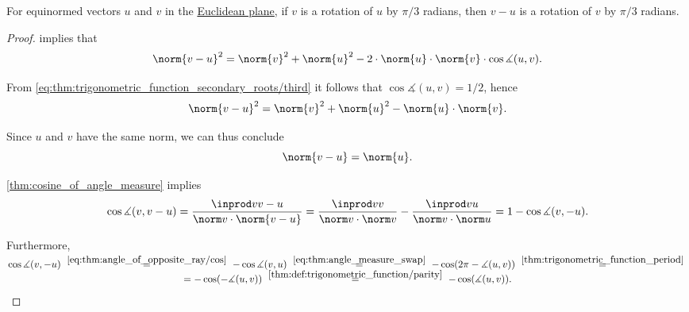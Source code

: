 \begin{lemma}\label{thm:v_minus_u_as_rotation}
  For equinormed vectors \( u \) and \( v \) in the \hyperref[def:euclidean_plane]{Euclidean plane}, if \( v \) is a rotation of \( u \) by \( \pi / 3 \) radians, then \( v - u \) is a rotation of \( v \) by \( \pi / 3 \) radians.
\end{lemma}
\begin{proof}
    implies that
  \begin{equation*}
    \norm{v - u}^2 = \norm{v}^2 + \norm{u}^2 - 2 \cdot \norm{u} \cdot \norm{v} \cdot \cos\measuredangle(u, v).
  \end{equation*}

  From \eqref{eq:thm:trigonometric_function_secondary_roots/third} it follows that \( \cos\measuredangle(u, v) = 1 / 2 \), hence
  \begin{equation*}
    \norm{v - u}^2 = \norm{v}^2 + \norm{u}^2 - \norm{u} \cdot \norm{v}.
  \end{equation*}

  Since \( u \) and \( v \) have the same norm, we can thus conclude
  \begin{equation}\label{eq:thm:v_minus_u_as_rotation/v_minus_u_norm}
    \norm{v - u} = \norm{u}.
  \end{equation}

   \cref{thm:cosine_of_angle_measure} implies
  \begin{equation}\label{eq:thm:v_minus_u_as_rotation/proof/cos_v_and_minus_u/main}
    \cos \measuredangle(v, v - u)
    =
    \frac {\inprod v {v - u}} {\norm v \cdot \norm {v - u}}
    =
    \frac {\inprod v v} {\norm v \cdot \norm v}
    -
    \frac {\inprod v u} {\norm v \cdot \norm u}
    =
    1 - \cos\measuredangle(v, -u).
  \end{equation}

  Furthermore,
  \begin{multline*}
    \cos \measuredangle(v, -u)
    \reloset {\eqref{eq:thm:angle_of_opposite_ray/cos}} =
    -\cos \measuredangle(v, u)
    \reloset {\eqref{eq:thm:angle_measure_swap}} =
    -\cos(2\pi - \measuredangle(u, v))
    \reloset {\ref{thm:trigonometric_function_period}} = \\ =
    -\cos(-\measuredangle(u, v))
    \reloset {\ref{thm:def:trigonometric_function/parity}} =
    -\cos(\measuredangle(u, v)).
  \end{multline*}


\end{proof}
